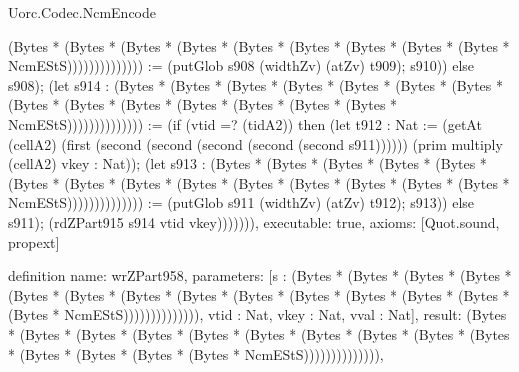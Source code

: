 \begin{lexlean}{Uorc.Codec.NcmEncode}
\begin{semanticmodule}
{(Bytes * (Bytes * (Bytes * (Bytes * (Bytes * (Bytes * (Bytes * (Bytes * (Bytes * NcmEStS)))))))))))))) := (putGlob s908 (widthZv) (atZv) t909); s910)) else s908); (let s914 : (Bytes * (Bytes * (Bytes * (Bytes * (Bytes * (Bytes * (Bytes * (Bytes * (Bytes * (Bytes * (Bytes * (Bytes * (Bytes * (Bytes * NcmEStS)))))))))))))) := (if (vtid =? (tidA2)) then (let t912 : Nat := (getAt (cellA2) (first (second (second (second (second (second s911)))))) (prim multiply (cellA2) vkey : Nat)); (let s913 : (Bytes * (Bytes * (Bytes * (Bytes * (Bytes * (Bytes * (Bytes * (Bytes * (Bytes * (Bytes * (Bytes * (Bytes * (Bytes * (Bytes * NcmEStS)))))))))))))) := (putGlob s911 (widthZv) (atZv) t912); s913)) else s911); (rdZPart915 s914 vtid vkey))))))),
  executable: true,
  axioms: [Quot.sound, propext]
}

definition{
  name: wrZPart958,
  parameters: [s : (Bytes * (Bytes * (Bytes * (Bytes * (Bytes * (Bytes * (Bytes * (Bytes * (Bytes * (Bytes * (Bytes * (Bytes * (Bytes * (Bytes * NcmEStS)))))))))))))), vtid : Nat, vkey : Nat, vval : Nat],
  result: (Bytes * (Bytes * (Bytes * (Bytes * (Bytes * (Bytes * (Bytes * (Bytes * (Bytes * (Bytes * (Bytes * (Bytes * (Bytes * (Bytes * NcmEStS)))))))))))))),
}
\end{semanticmodule}
\end{lexlean}
